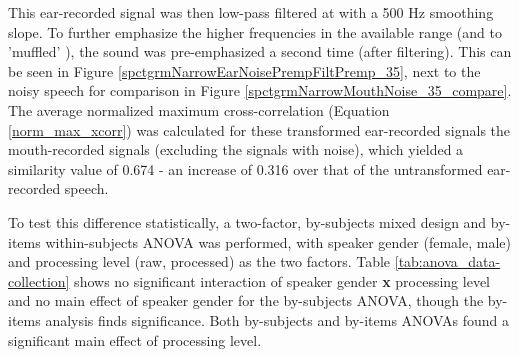 This ear-recorded signal was then low-pass filtered at \DIFdelbegin {}\DIFdelend \DIFaddbegin {}\DIFaddend with a 500 Hz smoothing slope. To further emphasize the higher frequencies in the available range (and to \DIFdelbegin {}\DIFdelend \DIFaddbegin {}\DIFaddend 'muffled' \DIFdelbegin {}\DIFdelend \DIFaddbegin {}\DIFaddend ), the sound was pre-emphasized a second time (after filtering).  This can be seen in Figure \ref{spctgrmNarrowEarNoisePrempFiltPremp_35}, next to the noisy \DIFdelbegin {}\DIFdelend \DIFaddbegin {}\DIFaddend speech for comparison in Figure \ref{spctgrmNarrowMouthNoise_35_compare}.  The average normalized maximum cross-correlation (Equation \ref{norm_max_xcorr}) was calculated for these transformed ear-recorded signals \DIFdelbegin {}\DIFdelend \DIFaddbegin {}\DIFaddend the mouth-recorded signals (excluding the signals with noise), which yielded a \DIFdelbegin {}\DIFdelend similarity value of 0.674 - an increase of 0.316 over that of the untransformed ear-recorded speech.

To test this difference statistically, a two-factor, by-subjects mixed design and by-items within-subjects ANOVA was performed, with speaker gender (female, male) and processing level (raw, processed) as the two factors.  Table \ref{tab:anova_data-collection} shows no significant interaction of speaker gender \textbf{x} processing level and no main effect of speaker gender for the by-subjects ANOVA, though the by-items analysis finds significance.  Both by-subjects and by-items ANOVAs found a significant main effect of processing level.




